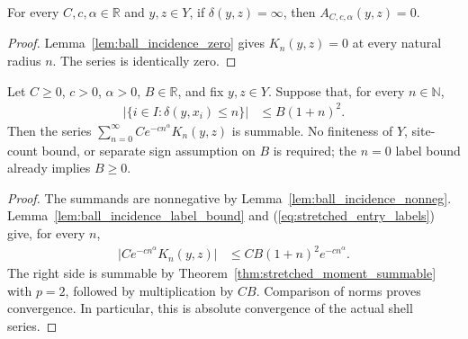 \begin{lemma}
    \label{lem:stretched_ball_zero}
    \leanok
    For every $C,c,\alpha\in\mathbb R$ and $y,z\in Y$, if
    $\delta(y,z)=\infty$, then $A_{C,c,\alpha}(y,z)=0$.
\end{lemma}
\begin{proof}
    \leanok
    Lemma~\ref{lem:ball_incidence_zero} gives $K_n(y,z)=0$ at every
    natural radius $n$.  The series is identically zero.
\end{proof}

\begin{theorem}
    \label{thm:stretched_ball_summable}
    \leanok
    Let $C\geq0$, $c>0$, $\alpha>0$, $B\in\mathbb R$, and fix
    $y,z\in Y$.  Suppose that, for every $n\in\mathbb N$,
    \begin{align}
        \bigl|\{i\in I:\delta(y,x_i)\leq n\}\bigr|
         & \leq B(1+n)^2.
        \label{eq:stretched_entry_labels}
    \end{align}
    Then the series
    $\sum_{n=0}^{\infty}C e^{-cn^\alpha}K_n(y,z)$ is summable.
    No finiteness of $Y$, site-count bound, or separate sign assumption
    on $B$ is required; the $n=0$ label bound already implies $B\geq0$.
\end{theorem}
\begin{proof}
    \leanok
    The summands are nonnegative by
    Lemma~\ref{lem:ball_incidence_nonneg}.
    Lemma~\ref{lem:ball_incidence_label_bound} and
    (\ref{eq:stretched_entry_labels}) give, for every $n$,
    \begin{align}
        \bigl|C e^{-cn^\alpha}K_n(y,z)\bigr|
         & \leq CB(1+n)^2e^{-cn^\alpha}.
        \label{eq:stretched_entry_majorant}
    \end{align}
    The right side is summable by
    Theorem~\ref{thm:stretched_moment_summable} with $p=2$,
    followed by multiplication by $CB$.
    Comparison of norms proves convergence.  In particular, this is
    absolute convergence of the actual shell series.
\end{proof}

